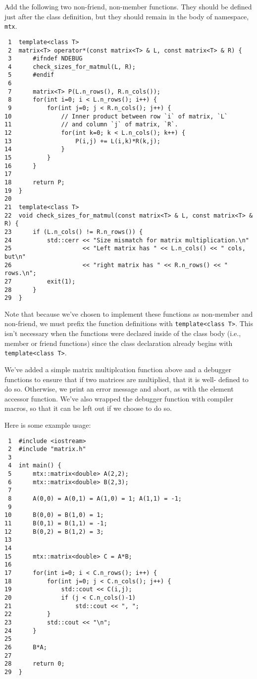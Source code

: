 \documentclass[11pt]{article}
\begin{document}
Add the following two non-friend, non-member functions. They should be defined 
just after the class definition, but they should remain in the body of namespace,
\texttt{mtx}.

\begin{verbatim}
 1  template<class T>
 2  matrix<T> operator*(const matrix<T> & L, const matrix<T> & R) {
 3      #ifndef NDEBUG
 4      check_sizes_for_matmul(L, R);
 5      #endif
 6  
 7      matrix<T> P(L.n_rows(), R.n_cols());
 8      for(int i=0; i < L.n_rows(); i++) {
 9          for(int j=0; j < R.n_cols(); j++) {
10              // Inner product between row `i` of matrix, `L`
11              // and column `j` of matrix, `R`.
12              for(int k=0; k < L.n_cols(); k++) {
13                  P(i,j) += L(i,k)*R(k,j);
14              }
15          }
16      }
17  
18      return P;
19  }
20  
21  template<class T>
22  void check_sizes_for_matmul(const matrix<T> & L, const matrix<T> & R) {
23      if (L.n_cols() != R.n_rows()) {
24          std::cerr << "Size mismatch for matrix multiplication.\n"
25                    << "Left matrix has " << L.n_cols() << " cols, but\n"
26                    << "right matrix has " << R.n_rows() << " rows.\n";
27          exit(1);
28      }
29  }
\end{verbatim}

Note that because we've chosen to implement these functions as non-member 
and non-friend, we must prefix the function definitions with 
\texttt{template<class T>}. This isn't necessary when the functions were declared 
inside of the class body (i.e., member or friend functions) since the class 
declaration already begins with \texttt{template<class T>}.

We've added a simple matrix multiplcation function above and a debugger 
functions to ensure that if two matrices are multiplied, that it is well-
defined to do so. Otherwise, we print an error message and abort, as with 
the element accessor function. We've also wrapped the debugger function 
with compiler macros, so that it can be left out if we choose to do so.

Here is some example usage:

\begin{verbatim}
 1  #include <iostream>
 2  #include "matrix.h"
 3  
 4  int main() {
 5      mtx::matrix<double> A(2,2);
 6      mtx::matrix<double> B(2,3);
 7  
 8      A(0,0) = A(0,1) = A(1,0) = 1; A(1,1) = -1;
 9  
10      B(0,0) = B(1,0) = 1;
11      B(0,1) = B(1,1) = -1;
12      B(0,2) = B(1,2) = 3;
13  
14  
15      mtx::matrix<double> C = A*B;
16  
17      for(int i=0; i < C.n_rows(); i++) {
18          for(int j=0; j < C.n_cols(); j++) {
19              std::cout << C(i,j);
20              if (j < C.n_cols()-1)
21                  std::cout << ", ";
22          }
23          std::cout << "\n";
24      }
25  
26      B*A;
27  
28      return 0;
29  }
\end{verbatim}
\end{document}
